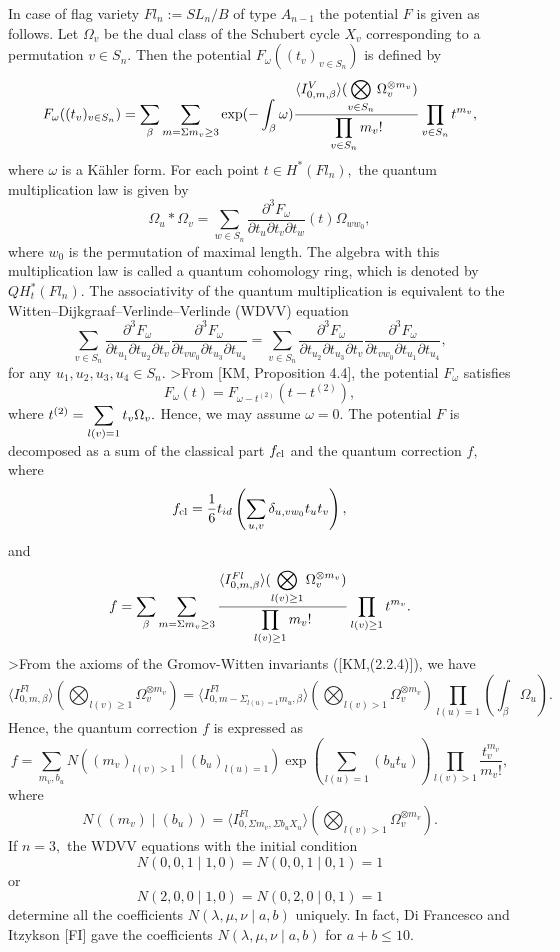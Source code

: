 In case of flag variety $Fl_n:=SL_n/B$ of type $A_{n-1}$ the 
potential $F$ is given as follows. 
Let $\Omega _v$ be the dual class of the Schubert cycle $X_v$ 
corresponding to a permutation $v\in S_n.$ Then the 
potential $F_{\omega}((t_v)_{v\in S_n})$ is defined by 
$$ F_{\omega}((t_v)_{v\in S_n}) = \sum_{\beta} 
\sum_{m=\Sigma m_v \geq 3} \exp(-\int_{\beta}\omega)
\frac{ \langle I_{0,m,\beta}^{V} \rangle 
(\displaystyle\bigotimes _{v\in S_n}\Omega_v^{\otimes m_v})}
{\displaystyle\prod_{v\in S_n} m_v !}\prod_{v\in S_n}t^{m_v}, 
$$
where $\omega$ is a K\"ahler form. For each point 
$t\in H^{\ast} (Fl_n),$ the quantum multiplication law is 
given by 
$$ \Omega_u \ast \Omega_v = \sum_{w\in S_n}
\frac{\partial ^3 F_{\omega}}{\partial t_u \partial t_v 
\partial t_w}(t) \Omega_{ww_0}, 
$$ 
where $w_0$ is the permutation of maximal length. 
The algebra with this multiplication law is called a quantum cohomology 
ring, 
which is denoted by $QH^{\ast}_t (Fl_n).$ 
The associativity  of the quantum multiplication is 
equivalent to the Witten--Dijkgraaf--Verlinde--Verlinde 
(WDVV) equation 
\[ \sum_{v\in S_n}
\frac{\partial ^3 F_{\omega}}
{\partial t_{u_1} \partial t_{u_2} \partial t_{v}}
\frac{\partial ^3 F_{\omega}}
{\partial t_{vw_0} \partial t_{u_3} \partial t_{u_4}}
= \sum_{v\in S_n}
\frac{\partial ^3 F_{\omega}}
{\partial t_{u_2} \partial t_{u_3} \partial t_{v}}
\frac{\partial ^3 F_{\omega}}
{\partial t_{vw_0} \partial t_{u_1} \partial t_{u_4}}, \]
for any $u_1,u_2,u_3,u_4 \in S_n.$ 
>From [KM, Proposition 4.4], the potential $F_{\omega}$ 
satisfies 
\[ F_{\omega} (t) = F_{\omega - t^{(2)}}(t-t^{(2)}), \] 
where $t^{(2)} = \displaystyle\sum_{l(v) = 1} t_v \Omega_v .$ 
Hence, we may assume $\omega = 0.$ 
The potential $F$ is decomposed as a sum of the classical 
part $f_{\rm cl}$ and the quantum correction $f,$ where 
\[ f_{\rm cl} = \frac{1}{6} t_{id} 
\left( \sum_{u,v}\delta_{u,vw_0}t_u t_v \right) , \] 
and 
\[f = \sum_{\beta}\sum_{m = \Sigma m_v \geq 3}
\frac{\langle I_{0,m,\beta}^{Fl} \rangle 
(\displaystyle\bigotimes _{l(v) \geq 1}\Omega _v^{\otimes m_v})}
{\displaystyle\prod_{l(v)\geq 1} m_v !}\prod_{l(v)\geq 1}t^{m_v}. \]
>From the axioms of the Gromov-Witten invariants
([KM,(2.2.4)]), we have 
\[ \langle I_{0,m,\beta}^{Fl} \rangle 
(\bigotimes _{l(v)\geq 1} 
\Omega _{v}^{\otimes m_v}) = \langle 
I_{0,m-\Sigma_{l(u)=1}m_u,\beta}^{Fl} 
\rangle (\bigotimes _{l(v) > 1} \Omega _{v}^{\otimes m_v} )
\prod_{l(u)=1} \left( \int_{\beta}\Omega _u \right). \]
Hence, the quantum correction $f$ is expressed as 
\[ f = \sum_{m_v, b_u} N((m_v)_{l(v)>1} \mid (b_u)_{l(u)= 1})
\exp(\sum_{l(u)=1}(b_u t_u))\prod_{l(v)>1}\frac{t_v^{m_v}}
{m_v !}, \]
where \[ N((m_v) \mid (b_u)) = \langle 
I_{0, \Sigma m_v, \Sigma b_u X_u}^{Fl} \rangle 
\left( \bigotimes _{l(v)>1} \Omega _v^{\otimes m_v} \right). \]
If $n=3,$ the WDVV equations with the initial condition 
\[ N(0,0,1 \mid 1,0) = N(0,0,1 \mid 0,1) = 1 \] 
or 
\[ N(2,0,0 \mid 1,0) = N(0,2,0 \mid 0,1) = 1 \] 
determine all the coefficients $N(\lambda, \mu, \nu \mid a,b)$ 
uniquely. In fact, Di Francesco and Itzykson [FI] gave the 
coefficients $N(\lambda, \mu, \nu \mid a,b)$ for $a+b \leq 10.$ 

